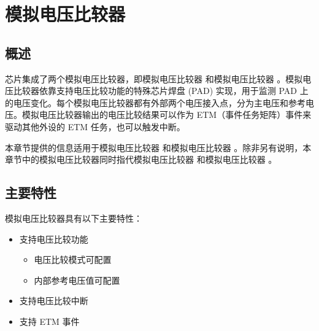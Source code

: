 \documentclass[main\_\_CN.tex]{subfiles}
\begin{document}

\ifglobal
\else
    {\let\clearpage\relax \listoftodos}
    {\let\clearpage\relax \listofdonetodos}
    \tableofcontents
\fi



\hypertarget{anacom}{}
\chapter{模拟电压比较器}
\label{mod:anacom}


\section{概述}

\chipname{} 芯片集成了两个模拟电压比较器，即模拟电压比较器  和模拟电压比较器 。模拟电压比较器依靠支持电压比较功能的特殊芯片焊盘 (PAD) 实现，用于监测 PAD 上的电压变化。每个模拟电压比较器都有外部两个电压接入点，分为主电压和参考电压。模拟电压比较器输出的电压比较结果可以作为 ETM（事件任务矩阵）事件来驱动其他外设的 ETM 任务，也可以触发中断。

\begin{tiplisting}
本章节提供的信息适用于模拟电压比较器  和模拟电压比较器 。除非另有说明，本章节中的模拟电压比较器同时指代模拟电压比较器  和模拟电压比较器 。
\end{tiplisting}
\vspace{-2em}


\section{主要特性}
\label{sec:anacom-features}

模拟电压比较器具有以下主要特性：

\begin{itemize}
    \item 支持电压比较功能
    \begin{itemize}
        \item 电压比较模式可配置
        \item 内部参考电压值可配置
    \end{itemize}
    \item 支持电压比较中断
    \item 支持 ETM 事件
\end{itemize}
\end{document}
